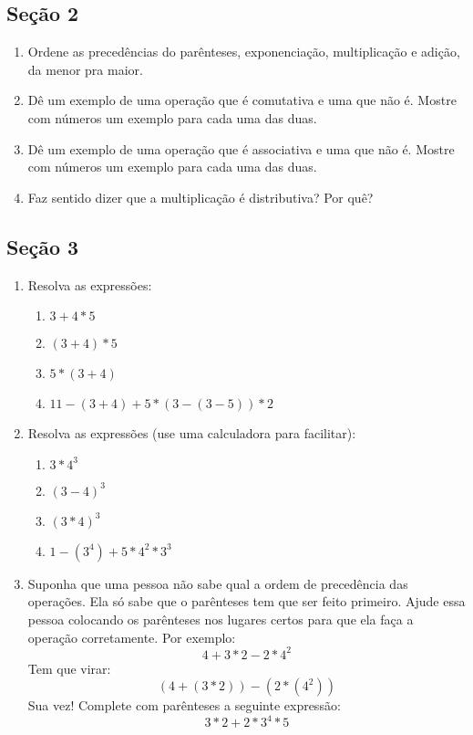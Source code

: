 \documentclass{article}
\begin{document}
\subsection{Seção 2}
\begin{enumerate}
	\item Ordene as precedências do parênteses, exponenciação, multiplicação e 
adição, da menor pra maior.
	\item Dê um exemplo de uma operação que é comutativa e uma que não é. Mostre
com números um exemplo para cada uma das duas.
	\item Dê um exemplo de uma operação que é associativa e uma que não é. 
Mostre com números um exemplo para cada uma das duas.
	\item Faz sentido dizer que a multiplicação é distributiva? Por quê?
\end{enumerate}

\subsection{Seção 3}
\begin{enumerate}
	\item Resolva as expressões:
	\begin{enumerate}
		\item $3 + 4*5$
		\item $(3 + 4)*5$
		\item $5*(3 + 4)$
		\item $11 - (3 + 4) + 5*(3 - (3 - 5))*2$
	\end{enumerate}
	\item Resolva as expressões (use uma calculadora para facilitar):
	\begin{enumerate}
		\item $3 * 4^3$
		\item ${(3 - 4)}^3$
		\item ${(3 * 4)}^3$
		\item $1 - (3^4) + 5*4^2*3^3$
	\end{enumerate}
	\item Suponha que uma pessoa não sabe qual a ordem de precedência das
operações. Ela só sabe que o parênteses tem que ser feito primeiro.
Ajude essa pessoa colocando os parênteses nos lugares certos para que ela
faça a operação corretamente. Por exemplo:
$$4 + 3*2 - 2*4^2$$
Tem que virar:
$$(4 + (3*2)) - (2*(4^2))$$
Sua vez! Complete com parênteses a seguinte expressão:
$$3*2 + 2*3^4*5$$
\end{enumerate}
\end{document}
